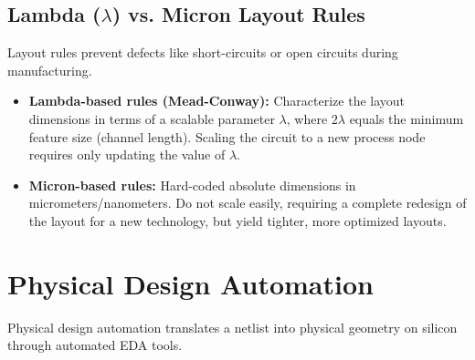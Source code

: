 \documentclass[12pt,a4paper]{article}
\begin{document}
\subsection{Lambda (\texorpdfstring{$\lambda$}{lambda}) vs. Micron Layout Rules}
Layout rules prevent defects like short-circuits or open circuits during manufacturing.
\begin{itemize}[leftmargin=*, itemsep=3.5pt]
  \item \textbf{Lambda-based rules (Mead-Conway):} Characterize the layout dimensions in terms of a scalable parameter $\lambda$, where $2\lambda$ equals the minimum feature size (channel length). Scaling the circuit to a new process node requires only updating the value of $\lambda$.
  \item \textbf{Micron-based rules:} Hard-coded absolute dimensions in micrometers/nanometers. Do not scale easily, requiring a complete redesign of the layout for a new technology, but yield tighter, more optimized layouts.
\end{itemize}

\section{Physical Design Automation}

Physical design automation translates a netlist into physical geometry on silicon through automated EDA tools.
\end{document}
